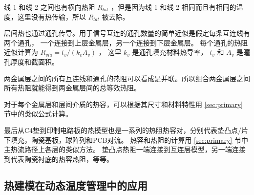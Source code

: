 线 1 和线 2 之间也有横向热阻 $R_{lat}$ ，但是因为线 1 和线 2 相同而且有相同的温度，这里没有热传输，所以 $R_{lat}$ 被去除。

层间热也通过通孔传导。用于信号互连的通孔数量的简单近似是假定每条互连线有两个通孔，
一个连接到上层金属层，另一个连接到下层金属层。
每个通孔的热阻近似计算为 $R_{via} = t_v/(k_vA_v)$ ， 这里 $k_v$ 是通孔填充材料热导率， $t_v$ 和 $A_v$ 是瞳孔厚度和截面积。

两金属层之间的所有互连线和通孔的热阻可以看成是并联。所以组合两金属层之间所有热阻就能得到两金属层间的总等效热阻。

对于每个金属层和层间介质的热容，可以根据其尺寸和材料特性用 \ref{sec:primary} 节中的类似公式计算。

最后从C4垫到印制电路板的热模型也是一系列的热阻热容对，分别代表垫凸点/片下填充，陶瓷基板，球阵列和PCB对流。
热容和热阻的计算用 \ref{sec:primary} 节中主热流路径上各层的类似方法。
垫凸点热阻一端连接到互连层模型，另一端连接到代表陶瓷衬底的热容热阻，等等。

\subsection{热建模在动态温度管理中的应用}\label{sec:hotspotinDTM}





























